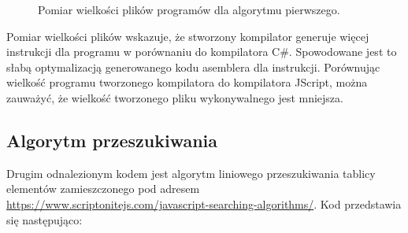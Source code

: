 \begin{figure}[h!]
  \centering
  \caption{Pomiar wielkości plików programów dla algorytmu pierwszego.}
\end{figure}

\par Pomiar wielkości plików wskazuje, że stworzony kompilator generuje więcej instrukcji dla programu w porównaniu do kompilatora C\#. Spowodowane jest to słabą optymalizacją generowanego kodu asemblera dla instrukcji. Porównując wielkość programu tworzonego kompilatora do kompilatora JScript, można zauważyć, że wielkość tworzonego pliku wykonywalnego jest mniejsza.


\newpage
\subsection{Algorytm przeszukiwania}

\par Drugim odnalezionym kodem jest algorytm liniowego przeszukiwania tablicy elementów zamieszczonego pod adresem \url{https://www.scriptonitejs.com/javascript-searching-algorithms/}. Kod przedstawia się następująco:

